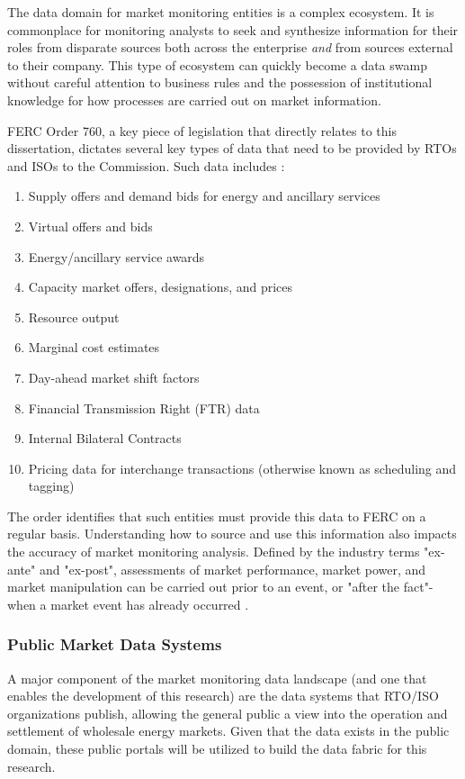 The data domain for market monitoring entities is a complex ecosystem. It is commonplace for monitoring analysts to seek and synthesize information for their roles from disparate sources both across the enterprise \textit{and} from sources external to their company. This type of ecosystem can quickly become a data swamp without careful attention to business rules and the possession of institutional knowledge for how processes are carried out on market information.

FERC Order 760, a key piece of legislation that directly relates to this dissertation, dictates several key types of data that need to be provided by RTOs and ISOs to the Commission. Such data includes \cite{daignault}: 

\begin{enumerate}
    \item{Supply offers and demand bids for energy and ancillary services}
    \item{Virtual offers and bids}
    \item{Energy/ancillary service awards}
    \item{Capacity market offers, designations, and prices}
    \item{Resource output}
    \item{Marginal cost estimates}
    \item{Day-ahead market shift factors}
    \item{Financial Transmission Right (FTR) data}
    \item{Internal Bilateral Contracts}
    \item{Pricing data for interchange transactions (otherwise known as scheduling and tagging)}
\end{enumerate}

The order identifies that such entities must provide this data to FERC on a regular basis. Understanding how to source and use this information also impacts the accuracy of market monitoring analysis. Defined by the industry terms "ex-ante" and "ex-post", assessments of market performance, market power, and market manipulation can be carried out prior to an event, or "after the fact"- when a market event has already occurred \cite{green-neuhoff-newberry}.

\subsubsection{Public Market Data Systems}

A major component of the market monitoring data landscape (and one that enables the development of this research) are the data systems that RTO/ISO organizations publish, allowing the general public a view into the operation and settlement of wholesale energy markets. Given that the data exists in the public domain, these public portals will be utilized to build the data fabric for this research.

